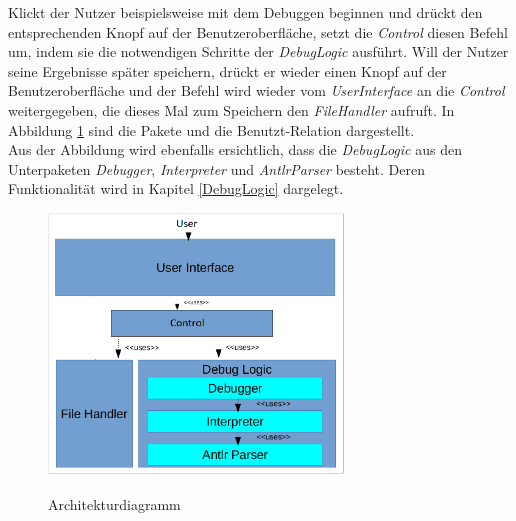 \documentclass[parskip=full]{scrartcl}
\begin{document}
Klickt der Nutzer beispielsweise mit dem Debuggen beginnen und drückt den entsprechenden Knopf auf der Benutzeroberfläche, setzt die \textit{Control} diesen Befehl um, indem sie die notwendigen Schritte der \textit{DebugLogic} ausführt. Will der Nutzer seine Ergebnisse später speichern, drückt er wieder einen Knopf auf der Benutzeroberfläche und der Befehl wird wieder vom \textit{UserInterface} an die \textit{Control} weitergegeben, die dieses Mal zum Speichern den \textit{FileHandler} aufruft. In Abbildung \ref{Architekturdiagramm} sind die Pakete und die Benutzt-Relation dargestellt. \\
Aus der Abbildung wird ebenfalls ersichtlich, dass die \textit{DebugLogic} aus den Unterpaketen \textit{Debugger}, \textit{Interpreter} und \textit{AntlrParser} besteht. Deren Funktionalität wird in Kapitel \ref{DebugLogic} dargelegt. \\

\newpage

\begin{figure}[!h]
\centering
\includegraphics[width=0.7\textwidth]{../Plichtenheft/Architektur.png} \\
\caption{Architekturdiagramm}
\label{Architekturdiagramm}
\end{figure}

\newpage
\end{document}
